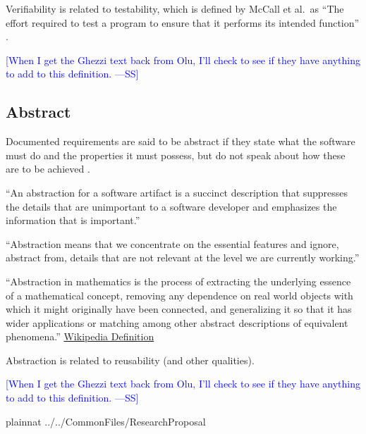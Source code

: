 \documentclass[letterpaper,cleveref]{lipics-v2019}
\newcommand{\authornote}[3]{\textcolor{#1}{[#3 ---#2]}}
\newcommand{\authornote}[3]{}
\newcommand{\wss}[1]{\authornote{blue}{SS}{#1}} %
\theoremstyle{definition}
\begin{document}
Verifiability is related to testability, which is defined by McCall et al.\ as
``The effort required to test a program to ensure that it performs its intended
function'' \cite{VanVliet2000}.  

\wss{When I get the Ghezzi text back from Olu,
  I'll check to see if they have anything to add to this definition.}

\subsection{Abstract}

Documented requirements are said to be abstract if they state what the software
must do and the properties it must possess, but do not speak about how these are
to be achieved \citep{GhezziEtAl2003}.  

``An abstraction for a software artifact is a succinct description that suppresses
the details that are unimportant to a software developer and emphasizes the
information that is important.'' \cite{Krueger1992}

``Abstraction means that we concentrate on the essential features and ignore,
abstract from, details that are not relevant at the level we are currently
working.''  \cite[p.\ 296]{VanVliet2000}

``Abstraction in mathematics is the process of extracting the underlying essence
of a mathematical concept, removing any dependence on real world objects with
which it might originally have been connected, and generalizing it so that it
has wider applications or matching among other abstract descriptions of
equivalent phenomena.''
\href{https://en.wikipedia.org/wiki/Abstraction_(mathematics)} {Wikipedia
  Definition}

Abstraction is related to reusability (and other qualities).

\wss{When I get the Ghezzi text back from Olu, I'll check to see if they have
  anything to add to this definition.}

\newpage

 {plainnat}
 {../../CommonFiles/ResearchProposal}
\end{document}
